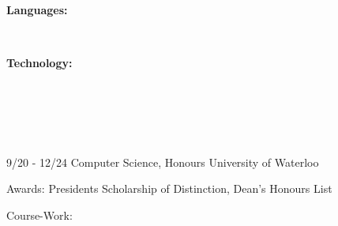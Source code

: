 \documentclass[9pt]{developercv} %
\begin{document}
\begin{minipage}[t]{\wII\textwidth}
    \vspace{-6pt} \\
        \begin{minipage}[t]{0.25\textwidth}
            \textbf{Languages:}
        \end{minipage}
        \hfill
        \begin{minipage}[t]{0.75\textwidth}
          \languages
        \end{minipage}
        \vspace{1mm} \\
        \begin{minipage}[t]{0.25\textwidth}
            \textbf{Technology:}
        \end{minipage}
        \hfill
        \begin{minipage}[t]{0.75\textwidth}
            \technologies
        \end{minipage}
\end{minipage}
\\ \\
\ExperienceList{\experiences}
\\
\ProjectList{\projects}
\vspace{\topSpace}
\\
\begin{entrylist}
    \entry
        {9/20 - 12/24}
        {Computer Science, Honours}
        {University of Waterloo}
	{
            \vspace{\topSpace}
            \begin{customItemize}
                \item Awards: Presidents Scholarship of Distinction, Dean's Honours List
                \item Course-Work: \courses
            \end{customItemize}
        }
\end{entrylist}
\end{document}
